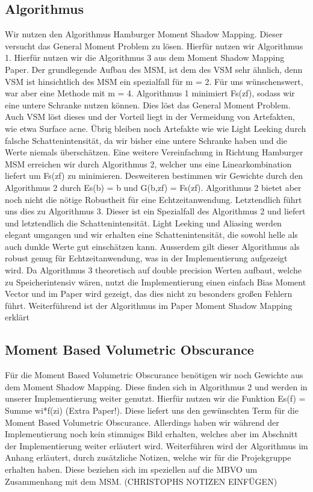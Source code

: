 \documentclass[runningheaders,a4paper]{llncs}
\begin{document}
\subsection{Algorithmus}
Wir nutzen den Algorithmus Hamburger Moment Shadow Mapping. Dieser versucht das General Moment Problem\cite{msm} zu lösen. Hierfür nutzen wir Algorithmus 1. Hierfür nutzen wir die Algorithmus 3 aus dem Moment Shadow Mapping Paper. Der grundlegende Aufbau des MSM, ist dem des VSM sehr ähnlich, denn VSM ist hinsichtlich des MSM ein spezialfall für m = 2. Für uns wünschenswert, war aber eine Methode mit m = 4.
Algorithmus 1 minimiert Fs(zf), sodass wir eine untere Schranke nutzen können. Dies löst das General Moment Problem. Auch VSM löst dieses und der Vorteil liegt in der Vermeidung von Artefakten, wie etwa Surface acne. Übrig bleiben noch Artefakte wie wie Light Leeking durch falsche Schattenintensität, da wir bisher eine untere Schranke haben und die Werte niemals überschätzen. Eine weitere Vereinfachung in Richtung Hamburger MSM erreichen wir durch Algorithmus 2, welcher uns eine Linearkombination liefert um Fs(zf) zu minimieren. Desweiteren bestimmen wir Gewichte durch den Algorithmus 2 durch Es(b) = b und G(b,zf) = Fs(zf). Algorithmus 2 bietet aber noch nicht die nötige Robustheit für eine Echtzeitanwendung.\cite{msm}
Letztendlich führt uns dies zu Algorithmus 3. Dieser ist ein Spezialfall des Algorithmus 2 und liefert und letztendlich die Schattenintensität. Light Leeking und Aliasing werden elegant umgangen und wir erhalten eine Schattenintensität, die sowohl helle als auch dunkle Werte gut einschätzen kann. Ausserdem gilt dieser Algorithmus als robust genug für Echtzeitanwendung, was in der Implementierung aufgezeigt wird. Da Algorithmus 3 theoretisch auf double precision Werten aufbaut, welche zu Speicherintensiv wären, nutzt die Implementierung einen einfach Bias Moment Vector und im Paper wird gezeigt, das dies nicht zu besonders großen Fehlern führt. Weiterführend ist der Algorithmus im Paper Moment Shadow Mapping erklärt\cite{msm}
\subsection{Moment Based Volumetric Obscurance}
Für die Moment Based Volumetric Obscurance benötigen wir noch Gewichte aus dem Moment Shadow Mapping. Diese finden sich in Algorithmus 2 und werden in unserer Implementierung weiter genutzt.
Hierfür nutzen wir die Funktion Es(f) = Summe wi*f(zi) (Extra Paper!). Diese liefert uns den gewünschten Term für die Moment Based Volumetric Obscurance. Allerdings haben wir während der Implementierung noch kein stimmiges Bild erhalten, welches aber im Abschnitt der Implementierung weiter erläutert wird. Weiterführen wird der Algorithmus im Anhang erläutert, durch zusätzliche Notizen, welche wir für die Projekgruppe erhalten haben. Diese beziehen sich im speziellen auf die MBVO um Zusammenhang mit dem MSM. (CHRISTOPHS NOTIZEN EINFÜGEN)
\end{document}
